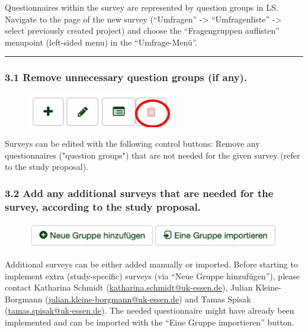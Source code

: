 Questionnaires within the survey are represented by question groups in LS.
Navigate to the page of the new survey (“Umfragen” -> “Umfragenliste” -> select previously created project) and choose the “Fragengruppen auflisten” menupoint (left-sided menu) in the “Umfrage-Menü”.

\par\noindent\rule{\textwidth\color{pniblue}}{0.4pt}
\subsubsection*{3.1 Remove unnecessary question groups (if any).}
\begin{figure}
\centering
\includegraphics{docs/fig/ls_sop3.1.png}
\end{figure}

Surveys can be edited with the following control buttons: 
Remove any questionnaires ("question groups") that are not needed for the given survey (refer to the study proposal).

\pagebreak
\subsubsection*{3.2 Add any additional surveys that are needed for the survey, according to the study proposal.}

\begin{figure}
\centering
\includegraphics{docs/fig/ls_sop3.2.png}
\end{figure}

Additional surveys can be either added manually or imported.
Before starting to implement extra (study-specific) surveys (via “Neue Gruppe hinzufügen”), please contact Katharina Schmidt (\href{mailto:katharina.schmidt@uk-essen.de}{katharina.schmidt@uk-essen.de}),  Julian Kleine-Borgmann (\href{mailto:julian.kleine-borgmann@uk-essen.de}{julian.kleine-borgmann@uk-essen.de}) and Tamas Spisak (\href{mailto:tamas.spisak@uk-essen.de}{tamas.spisak@uk-essen.de}). The needed questionnaire might have already been implemented and can be imported with the “Eine Gruppe importieren” button.


